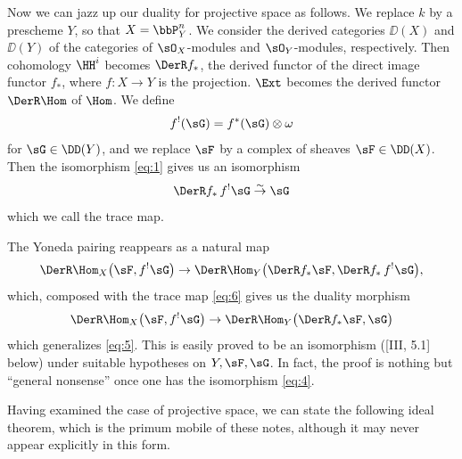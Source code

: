 Now we can jazz up our duality for projective space as follows. We replace $k$ by a prescheme $Y$, so that $X=\bbP_{Y}^{n}$. We consider the derived categories $\DD(X)$ and $\DD(Y)$ of the categories of $\sO_{X}$-modules and $\sO_{Y}$-modules, respectively. Then cohomology $\HH^{i}$ becomes $\DerR f_{*}$, the derived functor of the direct image functor $f_{*}$, where $f\colon X\to Y$ is the projection. $\Ext$ becomes the derived functor $\DerR\Hom$ of $\Hom$. We define
\[
f^{!}(\sG)=f^{*}(\sG)\otimes\omega
\]
for $\sG\in \DD(Y)$, and we replace $\sF$ by a complex of sheaves $\sF\in \DD(X)$. Then the isomorphism \eqref{eq:1} gives us an isomorphism
\begin{equation}\label{eq:6}
	\DerR f_{*}\,f^{!}\sG\stackrel{\sim}{\to}\sG
\end{equation}
which we call the trace map.

The Yoneda pairing reappears as a natural map
\begin{equation}\label{eq:7}
	\DerR\Hom_{X}\bigl(\sF,f^{!}\sG\bigr)\to \DerR\Hom_{Y}\bigl(\DerR f_{*}\sF,\DerR f_{*}\,f^{!}\sG\bigr),
\end{equation}
which, composed with the trace map \eqref{eq:6} gives us the duality morphism
\begin{equation}\label{eq:8}
	\DerR\Hom_{X}\bigl(\sF,f^{!}\sG\bigr)\to \DerR\Hom_{Y}\bigl(\DerR f_{*}\sF,\sG\bigr)
\end{equation}
which generalizes \eqref{eq:5}. This is easily proved to be an isomorphism ([III, 5.1] below) under suitable hypotheses on $Y,\sF,\sG$. In fact, the proof is nothing but ``general nonsense'' once one has the isomorphism \eqref{eq:4}.

Having examined the case of projective space, we can state the following ideal theorem, which is the primum mobile of these notes, although it may never appear explicitly in this form.

